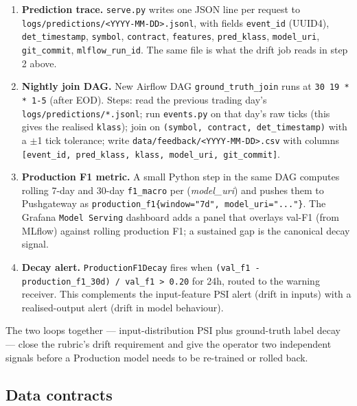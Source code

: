 \documentclass[11pt,a4paper]{article}
\begin{document}
\begin{enumerate}[leftmargin=1.5em,itemsep=0pt]
  \item \textbf{Prediction trace.} \texttt{serve.py} writes one JSON line per request to \texttt{logs/predictions/<YYYY-MM-DD>.jsonl}, with fields \texttt{event\_id} (UUID4), \texttt{det\_timestamp}, \texttt{symbol}, \texttt{contract}, \texttt{features}, \texttt{pred\_klass}, \texttt{model\_uri}, \texttt{git\_commit}, \texttt{mlflow\_run\_id}. The same file is what the drift job reads in step 2 above.
  \item \textbf{Nightly join DAG.} New Airflow DAG \texttt{ground\_truth\_join} runs at \texttt{30 19 * * 1-5} (after EOD). Steps: read the previous trading day's \texttt{logs/predictions/*.jsonl}; run \texttt{events.py} on that day's raw ticks (this gives the realised \texttt{klass}); join on \texttt{(symbol, contract, det\_timestamp)} with a $\pm$1 tick tolerance; write \texttt{data/feedback/<YYYY-MM-DD>.csv} with columns \texttt{[event\_id, pred\_klass, klass, model\_uri, git\_commit]}.
  \item \textbf{Production F1 metric.} A small Python step in the same DAG computes rolling 7-day and 30-day \texttt{f1\_macro} per (\emph{model\_uri}) and pushes them to Pushgateway as \texttt{production\_f1\{window="7d", model\_uri="..."\}}. The Grafana \texttt{Model Serving} dashboard adds a panel that overlays val-F1 (from MLflow) against rolling production F1; a sustained gap is the canonical decay signal.
  \item \textbf{Decay alert.} \texttt{ProductionF1Decay} fires when \texttt{(val\_f1 - production\_f1\_30d) / val\_f1 > 0.20} for 24h, routed to the warning receiver. This complements the input-feature PSI alert (drift in inputs) with a realised-output alert (drift in model behaviour).
\end{enumerate}

The two loops together --- input-distribution PSI plus ground-truth label decay --- close the rubric's drift requirement and give the operator two independent signals before a Production model needs to be re-trained or rolled back.

\subsection{Data contracts}
\end{document}
